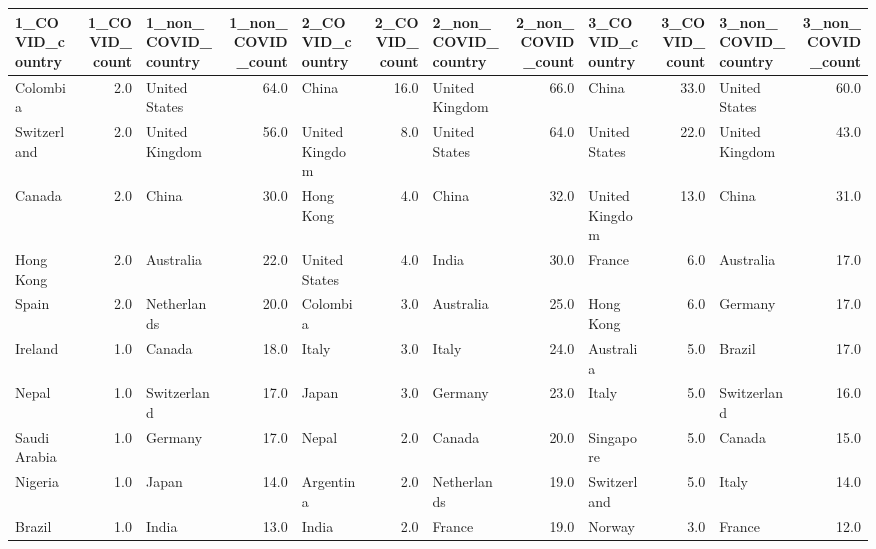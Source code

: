 \begin{tabular}{lrlrlrlrlrlr}
\toprule
1\_COVID\_country &  1\_COVID\_count & 1\_non\_COVID\_country &  1\_non\_COVID\_count & 2\_COVID\_country &  2\_COVID\_count & 2\_non\_COVID\_country &  2\_non\_COVID\_count & 3\_COVID\_country &  3\_COVID\_count & 3\_non\_COVID\_country &  3\_non\_COVID\_count \\
\midrule
       Colombia &            2.0 &       United States &               64.0 &           China &           16.0 &      United Kingdom &               66.0 &           China &           33.0 &       United States &               60.0 \\
    Switzerland &            2.0 &      United Kingdom &               56.0 &  United Kingdom &            8.0 &       United States &               64.0 &   United States &           22.0 &      United Kingdom &               43.0 \\
         Canada &            2.0 &               China &               30.0 &       Hong Kong &            4.0 &               China &               32.0 &  United Kingdom &           13.0 &               China &               31.0 \\
      Hong Kong &            2.0 &           Australia &               22.0 &   United States &            4.0 &               India &               30.0 &          France &            6.0 &           Australia &               17.0 \\
          Spain &            2.0 &         Netherlands &               20.0 &        Colombia &            3.0 &           Australia &               25.0 &       Hong Kong &            6.0 &             Germany &               17.0 \\
        Ireland &            1.0 &              Canada &               18.0 &           Italy &            3.0 &               Italy &               24.0 &       Australia &            5.0 &              Brazil &               17.0 \\
          Nepal &            1.0 &         Switzerland &               17.0 &           Japan &            3.0 &             Germany &               23.0 &           Italy &            5.0 &         Switzerland &               16.0 \\
   Saudi Arabia &            1.0 &             Germany &               17.0 &           Nepal &            2.0 &              Canada &               20.0 &       Singapore &            5.0 &              Canada &               15.0 \\
        Nigeria &            1.0 &               Japan &               14.0 &       Argentina &            2.0 &         Netherlands &               19.0 &     Switzerland &            5.0 &               Italy &               14.0 \\
         Brazil &            1.0 &               India &               13.0 &           India &            2.0 &              France &               19.0 &          Norway &            3.0 &              France &               12.0 \\
\bottomrule
\end{tabular}
